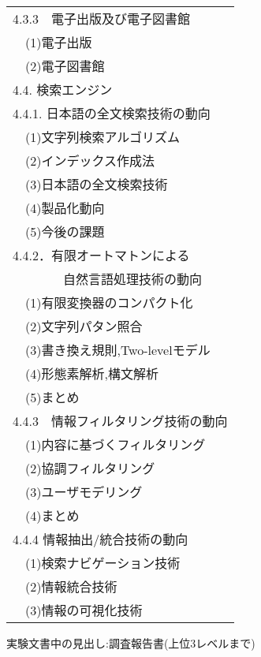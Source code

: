 \begin{figure}[htbp]
\begin{center}
\begin{minipage}[t]{7cm}
\begin{tabular}{l}
    \end{tabular}
  \end{minipage}
  \begin{minipage}[t]{6cm}
    \begin{tabular}{l}
    4.3.3　電子出版及び電子図書館\\
    \ \ (1)電子出版\\
    \ \ (2)電子図書館\\
    4.4. 検索エンジン\\
    4.4.1. 日本語の全文検索技術の動向\\
    \ \ (1)文字列検索アルゴリズム\\
    \ \ (2)インデックス作成法\\
    \ \ (3)日本語の全文検索技術\\
    \ \ (4)製品化動向\\
    \ \ (5)今後の課題\\
    4.4.2．有限オートマトンによる\\
    \ \ \ \ \ \ \ \ 自然言語処理技術の動向\\
    \ \ (1)有限変換器のコンパクト化\\
    \ \ (2)文字列パタン照合\\
    \ \ (3)書き換え規則,Two-levelモデル\\
    \ \ (4)形態素解析,構文解析\\
    \ \ (5)まとめ\\
    4.4.3　情報フィルタリング技術の動向\\
    \ \ (1)内容に基づくフィルタリング\\
    \ \ (2)協調フィルタリング\\
    \ \ (3)ユーザモデリング\\
    \ \ (4)まとめ\\
    4.4.4 情報抽出/統合技術の動向\\
    \ \ (1)検索ナビゲーション技術\\
    \ \ (2)情報統合技術\\
    \ \ (3)情報の可視化技術\\
    \end{tabular}
  \end{minipage}
    \caption{実験文書中の見出し:調査報告書(上位3レベルまで)}
    \label{fig:電子協の見出し}
  \end{center}
  
  
  \bigskip
  \begin{center}
  

\end{center}
\end{figure}

